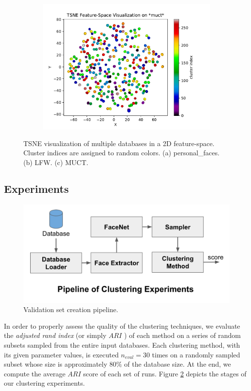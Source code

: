 \documentclass[conference]{IEEEtran}
\begin{document}
\begin{figure}[h]
\begin{subfigure}[b]{0.5\textwidth}
    \includegraphics[width=\linewidth]{tsne_view_muct}
    \caption{}
  \end{subfigure}
  \caption{TSNE visualization of multiple databases in a 2D feature-space. Cluster indices are assigned to random colors. (a) personal\_faces. (b) LFW. (c) MUCT.}
  \label{tsneview}
\end{figure}

\subsection{Experiments}

\begin{figure}[h]
  \includegraphics[width=\linewidth]{pipeline.png}
  \caption{Validation set creation pipeline.}
  \label{pipeline}
\end{figure}

In order to properly assess the quality of the clustering techniques, we evaluate the \textit{adjusted rand index} (or simply $ARI$ \cite{??}) of each method on a series of random subsets sampled from the entire input databases.
Each clustering method, with its given parameter values, is executed $n_{eval} = 30$ times on a randomly sampled subset whose size is approximately $80\%$ of the database size.
At the end, we compute the average $ARI$ score of each set of runs.
Figure \ref{pipeline} depicts the stages of our clustering experiments.
\end{document}
